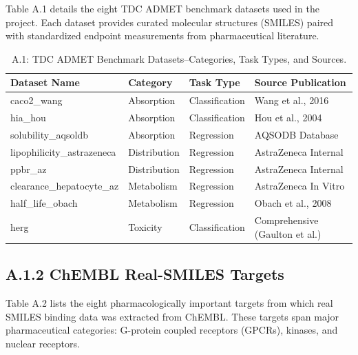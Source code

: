 \documentclass[a4paper,11pt,twoside]{report}
\begin{document}
Table A.1 details the eight TDC ADMET benchmark datasets used in the project. Each dataset provides curated molecular structures (SMILES) paired with standardized endpoint measurements from pharmaceutical literature.

\begin{table}[htbp]
\centering
\small
\caption{A.1: TDC ADMET Benchmark Datasets--Categories, Task Types, and Sources.}
\label{tab:tdc_benchmarks}
\begin{tabular}{l|l|l|l}
\hline
\textbf{Dataset Name} & \textbf{Category} & \textbf{Task Type} & \textbf{Source Publication} \\
\hline
caco2\_wang & Absorption & Classification & Wang et al., 2016 \\
hia\_hou & Absorption & Classification & Hou et al., 2004 \\
solubility\_aqsoldb & Absorption & Regression & AQSODB Database \\
lipophilicity\_astrazeneca & Distribution & Regression & AstraZeneca Internal \\
ppbr\_az & Distribution & Regression & AstraZeneca Internal \\
clearance\_hepatocyte\_az & Metabolism & Regression & AstraZeneca In Vitro \\
half\_life\_obach & Metabolism & Regression & Obach et al., 2008 \\
herg & Toxicity & Classification & Comprehensive (Gaulton et al.) \\
\hline
\end{tabular}
\end{table}

\subsection*{A.1.2 ChEMBL Real-SMILES Targets}

Table A.2 lists the eight pharmacologically important targets from which real SMILES binding data was extracted from ChEMBL. These targets span major pharmaceutical categories: G-protein coupled receptors (GPCRs), kinases, and nuclear receptors.
\end{document}
